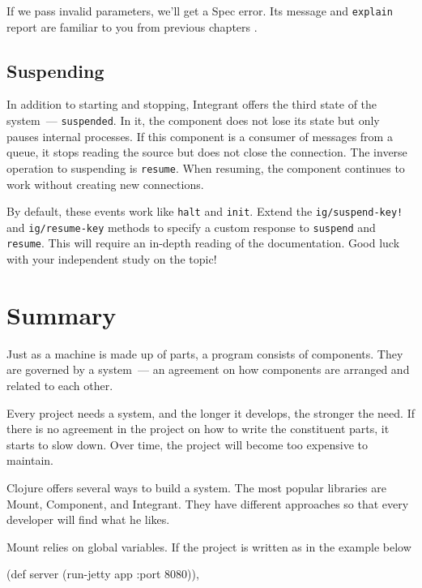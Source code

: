 \fi

\noindent
If we pass invalid parameters, we'll get a Spec error. Its message and \verb|explain| report are familiar to you from previous chapters .

\subsection{Suspending}


In addition to starting and stopping, Integrant offers the third state of the system~--- \verb|suspended|. In it, the component does not lose its state but only pauses internal processes. If this component is a consumer of messages from a queue, it stops reading the source but does not close the connection. The inverse operation to suspending is \verb|resume|. When resuming, the component continues to work without creating new connections.


By default, these events work like \verb|halt| and \verb|init|. Extend the \texttt{ig/sus\-pend\--key!} and \verb|ig/resume-key| methods to specify a custom response to \verb|suspend| and \verb|resume|. This will require an in-depth reading of the documentation. Good luck with your independent study on the topic!

\section{Summary}

Just as a machine is made up of parts, a program consists of components. They are governed by a system~--- an agreement on how components are arranged and related to each other.

Every project needs a system, and the longer it develops, the stronger the need. If there is no agreement in the project on how to write the constituent parts, it starts to slow down. Over time, the project will become too expensive to maintain.

Clojure offers several ways to build a system. The most popular libraries are Mount, Component, and Integrant. They have different approaches so that every developer will find what he likes.

Mount relies on global variables. If the project is written as in the example
below

\ifnarrow

\begin{english}
  \begin{clojure}
(def server
  (run-jetty app {:port 8080})),
  \end{clojure}
\end{english}

